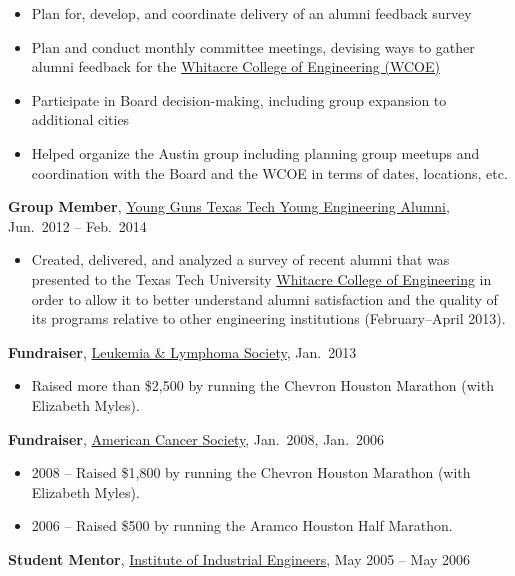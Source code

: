\documentclass[
]{article}
\providecommand{\tightlist}{%
  \setlength{\itemsep}{0pt}\setlength{\parskip}{0pt}}
\begin{document}
\begin{itemize}
\tightlist
\item
  Plan for, develop, and coordinate delivery of an alumni feedback
  survey
\item
  Plan and conduct monthly committee meetings, devising ways to gather
  alumni feedback for the \href{https://www.depts.ttu.edu/coe/}{Whitacre
  College of Engineering (WCOE)}
\item
  Participate in Board decision-making, including group expansion to
  additional cities
\item
  Helped organize the Austin group including planning group meetups and
  coordination with the Board and the WCOE in terms of dates, locations,
  etc.
\end{itemize}

\textbf{Group Member}, \href{http://www.ttuyoungguns.com/}{Young Guns
Texas Tech Young Engineering Alumni}, Jun.~2012 -- Feb.~2014

\begin{itemize}
\tightlist
\item
  Created, delivered, and analyzed a survey of recent alumni that was
  presented to the Texas Tech University
  \href{https://www.depts.ttu.edu/coe/}{Whitacre College of Engineering}
  in order to allow it to better understand alumni satisfaction and the
  quality of its programs relative to other engineering institutions
  (February--April 2013).
\end{itemize}

\textbf{Fundraiser}, \href{https://www.lls.org/}{Leukemia \& Lymphoma
Society}, Jan.~2013

\begin{itemize}
\tightlist
\item
  Raised more than \$2,500 by running the Chevron Houston Marathon (with
  Elizabeth Myles).
\end{itemize}

\textbf{Fundraiser}, \href{https://www.acs.org/}{American Cancer
Society}, Jan.~2008, Jan.~2006

\begin{itemize}
\tightlist
\item
  2008 -- Raised \$1,800 by running the Chevron Houston Marathon (with
  Elizabeth Myles).
\item
  2006 -- Raised \$500 by running the Aramco Houston Half Marathon.
\end{itemize}

\textbf{Student Mentor}, \href{https://www.iise.org/}{Institute of
Industrial Engineers}, May 2005 -- May 2006
\end{document}
